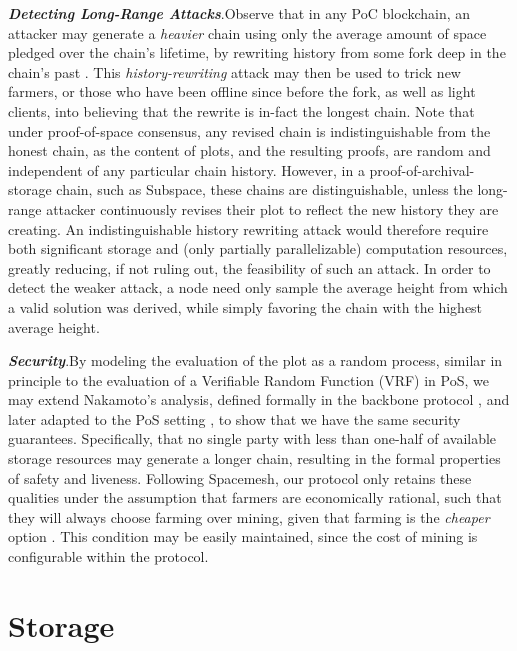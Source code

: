 \documentclass[conference]{IEEEtran}
\begin{document}
\noindent \textbf{\textit{Detecting Long-Range Attacks}}.\quad Observe that in any PoC blockchain, an attacker may generate a \textit{heavier} chain using only the average amount of space pledged over the chain's lifetime, by rewriting history from some fork deep in the chain’s past \cite{park2018spacemint,cohen2019chia}. This \textit{history-rewriting} attack may then be used to trick new farmers, or those who have been offline since before the fork, as well as light clients, into believing that the rewrite is in-fact the longest chain. Note that under proof-of-space consensus, any revised chain is indistinguishable from the honest chain, as the content of plots, and the resulting proofs, are random and independent of any particular chain history. However, in a proof-of-archival-storage chain, such as Subspace, these chains are distinguishable, unless the long-range attacker continuously revises their plot to reflect the new history they are creating. An indistinguishable history rewriting attack would therefore require both significant storage and (only partially parallelizable) computation resources, greatly reducing, if not ruling out, the feasibility of such an attack. In order to detect the weaker attack, a node need only sample the average height from which a valid solution was derived, while simply favoring the chain with the highest average height.

\vspace{2mm}

\noindent \textbf{\textit{Security}}.\quad By modeling the evaluation of the plot as a random process, similar in principle to the evaluation of a Verifiable Random Function (VRF) in PoS, we may extend Nakamoto’s analysis, defined formally in the backbone protocol \cite{garay2015bitcoin}, and later adapted to the PoS setting \cite{kiayias2017ouroboros}, to show that we have the same security guarantees. Specifically, that no single party with less than one-half of available storage resources may generate a longer chain, resulting in the formal properties of safety and liveness. Following Spacemesh, our protocol only retains these qualities under the assumption that farmers are economically rational, such that they will always choose farming over mining, given that farming is the \textit{cheaper} option \cite{moran2019simple}. This condition may be easily maintained, since the cost of mining is configurable within the protocol.

\section{Storage}
\end{document}
